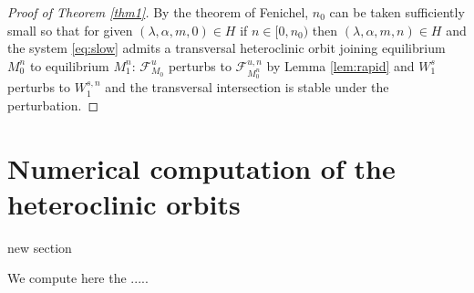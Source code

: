 \documentclass[a4paper,11pt]{article}
\def\red{\color{red}}
\theoremstyle{remark}
\begin{document}
\begin{proof}[Proof of Theorem \ref{thm1}] 
 By the theorem of Fenichel, $n_0$ can be taken sufficiently small so that for given $(\lambda,\alpha,m,0)\in H$ if $n \in [0, n_0)$ then $(\lambda,\alpha,m,n) \in H$ and  the system  \eqref{eq:slow} admits a transversal heteroclinic orbit joining equilibrium $M_0^{n}$ to equilibrium $M_1^{n}$: $\mathcal{F}^u_{M_0}$ perturbs to $\mathcal{F}^{u,n}_{M_0^n}$ by Lemma \ref{lem:rapid} and $W_1^s$ perturbs to $W_1^{s,n}$ and the transversal intersection is stable under the perturbation. 
\end{proof}



\vfil\eject
\section{Numerical computation of the heteroclinic orbits}
{\red new section}

We compute here the .....





\vfil\eject
\end{document}
